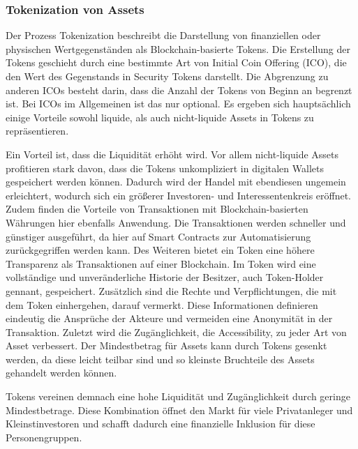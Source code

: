 \subsubsection{Tokenization von Assets}
\label{sec:Tokenization}
Der Prozess \glqq Tokenization\grqq{} beschreibt die Darstellung von finanziellen oder physischen
Wertgegenständen als Blockchain-basierte Tokens. Die Erstellung der Tokens geschieht durch 
eine bestimmte Art von Initial Coin Offering (ICO), die den Wert des Gegenstands in Security Tokens 
darstellt.
\cite[p.~82]{gupta2020tokenization}
Die Abgrenzung zu anderen ICOs besteht darin, dass die Anzahl der Tokens von Beginn an begrenzt ist.
Bei ICOs im Allgemeinen ist das nur optional.
\cite[p.66]{fill2020blockchain}
Es ergeben sich hauptsächlich einige Vorteile sowohl liquide, als auch nicht-liquide Assets in Tokens zu 
repräsentieren.

Ein Vorteil ist, dass die Liquidität erhöht wird.
Vor allem nicht-liquide Assets profitieren stark davon, dass die Tokens unkompliziert in digitalen
Wallets gespeichert werden können. Dadurch wird der Handel mit ebendiesen ungemein erleichtert, wodurch
sich ein größerer Investoren- und Interessentenkreis eröffnet.
Zudem finden die Vorteile von Transaktionen mit Blockchain-basierten Währungen hier ebenfalls Anwendung.
Die Transaktionen werden schneller und günstiger ausgeführt, da hier auf Smart Contracts zur 
Automatisierung zurückgegriffen werden kann. 
Des Weiteren bietet ein Token eine höhere Transparenz als Transaktionen auf einer Blockchain.
Im Token wird eine vollständige und unveränderliche Historie der Besitzer, auch Token-Holder gennant,
gespeichert. Zusätzlich sind die Rechte und Verpflichtungen, die mit dem Token einhergehen, darauf 
vermerkt.
Diese Informationen definieren eindeutig die Ansprüche der Akteure und vermeiden eine Anonymität in
der Transaktion.
Zuletzt wird die Zugänglichkeit, die Accessibility, zu jeder Art von Asset verbessert. 
Der Mindestbetrag für Assets kann durch Tokens gesenkt werden, da diese leicht teilbar sind und so 
kleinste Bruchteile des Assets gehandelt werden können.
\cite[p.~82]{gupta2020tokenization}

Tokens vereinen demnach eine hohe Liquidität und Zugänglichkeit durch geringe Mindestbetrage.
Diese Kombination öffnet den Markt für viele Privatanleger und Kleinstinvestoren und schafft dadurch
eine finanzielle Inklusion für diese Personengruppen.
\cite[p.~167]{chowdhary2025smart}





